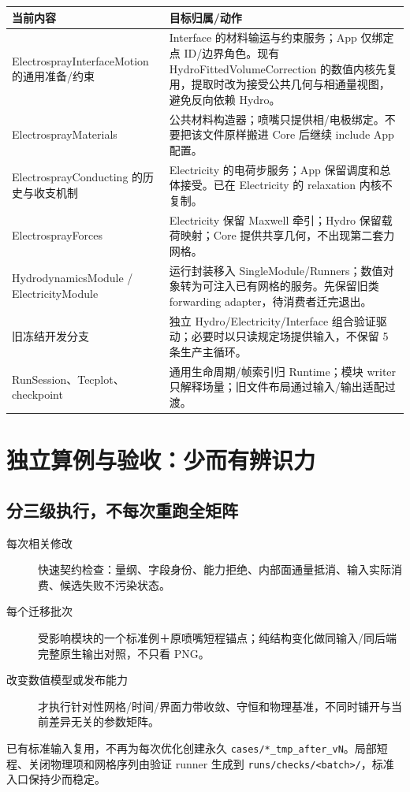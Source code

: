 \documentclass[UTF8,a4paper,11pt,fontset=fandol]{ctexart}
\numberwithin{equation}{section}
\newcommand{\code}[1]{\nolinkurl{#1}}
\begin{document}
\begin{longtable}{@{}P{.38\textwidth}P{.56\textwidth}@{}}
\toprule 当前内容 & 目标归属/动作\\\midrule\endhead
ElectrosprayInterfaceMotion 的通用准备/约束 & Interface 的材料输运与约束服务；App 仅绑定点 ID/边界角色。现有 HydroFittedVolumeCorrection 的数值内核先复用，提取时改为接受公共几何与相通量视图，避免反向依赖 Hydro。\\
ElectrosprayMaterials & 公共材料构造器；喷嘴只提供相/电极绑定。不要把该文件原样搬进 Core 后继续 include App 配置。\\
ElectrosprayConducting 的历史与收支机制 & Electricity 的电荷步服务；App 保留调度和总体接受。已在 Electricity 的 relaxation 内核不复制。\\
ElectrosprayForces & Electricity 保留 Maxwell 牵引；Hydro 保留载荷映射；Core 提供共享几何，不出现第二套力网格。\\
HydrodynamicsModule / ElectricityModule & 运行封装移入 SingleModule/Runners；数值对象转为可注入已有网格的服务。先保留旧类 forwarding adapter，待消费者迁完退出。\\
旧冻结开发分支 & 独立 Hydro/Electricity/Interface 组合验证驱动；必要时以只读规定场提供输入，不保留 5 条生产主循环。\\
RunSession、Tecplot、checkpoint & 通用生命周期/帧索引归 Runtime；模块 writer 只解释场量；旧文件布局通过输入/输出适配过渡。\\
\bottomrule
\end{longtable}

\section{独立算例与验收：少而有辨识力}\label{sec:validation}
\subsection{分三级执行，不每次重跑全矩阵}
\begin{description}
\item[每次相关修改] 快速契约检查：量纲、字段身份、能力拒绝、内部面通量抵消、输入实际消费、候选失败不污染状态。
\item[每个迁移批次] 受影响模块的一个标准例＋原喷嘴短程锚点；纯结构变化做同输入/同后端完整原生输出对照，不只看 PNG。
\item[改变数值模型或发布能力] 才执行针对性网格/时间/界面力带收敛、守恒和物理基准，不同时铺开与当前差异无关的参数矩阵。
\end{description}
已有标准输入复用，不再为每次优化创建永久 \code{cases/*_tmp_after_vN}。局部短程、关闭物理项和网格序列由验证 runner 生成到 \code{runs/checks/<batch>/}，标准入口保持少而稳定。
\end{document}
